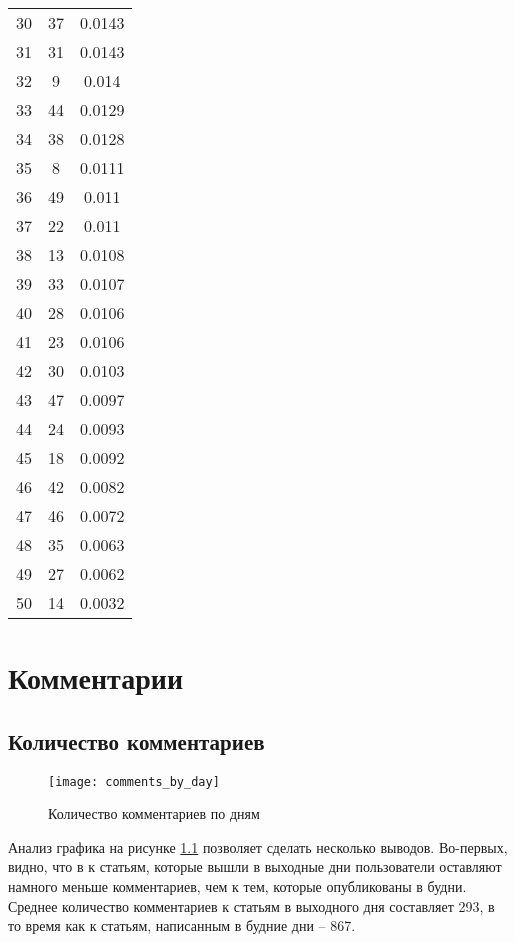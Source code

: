 \begin{longtable}[c]{|l|c|c|}
		30 & 37 & 0.0143 \\
		31 & 31 & 0.0143 \\
		32 & 9 & 0.014 \\
		33 & 44 & 0.0129 \\
		34 & 38 & 0.0128 \\
		35 & 8 & 0.0111 \\
		36 & 49 & 0.011 \\
		37 & 22 & 0.011 \\
		38 & 13 & 0.0108 \\
		39 & 33 & 0.0107 \\
		40 & 28 & 0.0106 \\
		41 & 23 & 0.0106 \\
		42 & 30 & 0.0103 \\
		43 & 47 & 0.0097 \\
		44 & 24 & 0.0093 \\
		45 & 18 & 0.0092 \\
		46 & 42 & 0.0082 \\
		47 & 46 & 0.0072 \\
		48 & 35 & 0.0063 \\
		49 & 27 & 0.0062 \\
		50 & 14 & 0.0032 \\
	\hline
\end{longtable}

\chapter{Комментарии} \label{app:comments}
\section{Количество комментариев}
\begin{figure}[h!]
	\centering
    \texttt{[image: comments\_by\_day]}
    \caption{Количество комментариев по дням}
    \label{fig:comments_by_day}
\end{figure}

Анализ графика на рисунке \ref{fig:comments_by_day} позволяет сделать несколько выводов. Во-первых, видно, что в к статьям, которые вышли в выходные дни пользователи оставляют намного меньше комментариев, чем к тем, которые опубликованы в будни. Среднее количество комментариев к статьям в выходного дня составляет 293, в то время как к статьям, написанным в будние дни -- 867.

